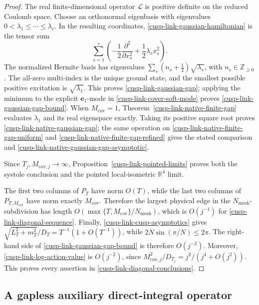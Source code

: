 \documentclass[11pt]{article}
\theoremstyle{definition}
\numberwithin{equation}{section}
\begin{document}
\begin{proof}
The real finite-dimensional operator \(\mathcal L\) is positive definite on
the reduced Coulomb space.  Choose an orthonormal eigenbasis with eigenvalues
\(0<\lambda_1\leq\cdots\leq\lambda_r\).  In the resulting coordinates,
\eqref{cusp-link-gaussian-hamiltonian} is the tensor sum
\[
 \sum_{s=1}^r
 \left(-\frac12\frac{\partial^2}{\partial x_s^2}
       +\frac12\lambda_sx_s^2\right).
\]
The normalized Hermite basis has eigenvalues
\(\sum_s(n_s+\tfrac12)\sqrt{\lambda_s}\), with
\(n_s\in\mathbb Z_{\geq0}\).  The all-zero multi-index is the unique ground
state, and the smallest possible positive excitation is
\(\sqrt{\lambda_1}\).  This proves \eqref{cusp-link-gaussian-gap}; applying
the minimum to the explicit \(\mathbf e_1\)-mode in
\eqref{cusp-link-cover-soft-mode} proves
\eqref{cusp-link-gaussian-gap-bound}.  When \(M_{\mathrm{cov}}=1\),
Theorem~\ref{cusp-link-native-finite-gap} evaluates \(\lambda_1\) and its
real eigenspace exactly.  Taking its positive square root proves
\eqref{cusp-link-native-gaussian-gap}; the same operation on
\eqref{cusp-link-native-finite-gap-uniform} and
\eqref{cusp-link-native-finite-gap-refined} gives the stated comparison and
\eqref{cusp-link-native-gaussian-gap-asymptotic}.

Since \(T_j,M_{\mathrm{cov},j}\to\infty\),
Proposition~\ref{cusp-link-pointed-limits} proves both the systole conclusion
and the pointed local-isometric \(\mathbb R^4\) limit.

The first two columns of \(P_T\) have norm \(O(T)\), while the last two
columns of \(P_{T,M_{\mathrm{cov}}}\) have norm exactly
\(M_{\mathrm{cov}}\).  Therefore the largest physical edge in the
\(N_{\mathrm{mesh}}\)-subdivision has length
\(O(\max\{T,M_{\mathrm{cov}}\}/N_{\mathrm{mesh}})\), which is \(O(j^{-1})\)
for \eqref{cusp-link-diagonal-sequence}.  Finally,
\eqref{cusp-link-cusp-asymptotics} gives
\(\sqrt{L_T^2+m_T^2}/D_T=T^{-1}(1+O(T^{-1}))\), while
\(2N\sin(\pi/N)\leq2\pi\).  The right-hand side of
\eqref{cusp-link-gaussian-gap-bound} is therefore \(O(j^{-2})\).
Moreover, \eqref{cusp-link-log-action-value} is \(O(j^{-2})\), since
\(M_{\mathrm{cov},j}^2/D_{T_j}=j^2/(j^4+O(j^2))\).
This proves every assertion in \eqref{cusp-link-diagonal-conclusions}.
\end{proof}

\subsection{A gapless auxiliary direct-integral operator}
\label{cusp-link-auxiliary-direct-integral}
\end{document}
